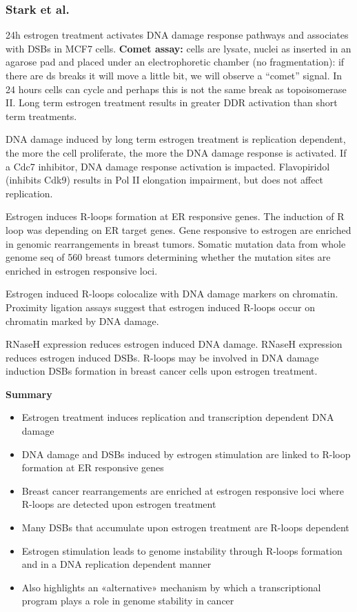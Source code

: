 \hypertarget{stark-et-al.}{%
\subsubsection{Stark et al.}\label{stark-et-al.}}

24h estrogen treatment activates DNA damage response pathways and associates with DSBs in MCF7 cells. \textbf{Comet assay:} cells are lysate, nuclei as inserted in an agarose pad and placed under an electrophoretic chamber (no fragmentation): if there are ds breaks it will move a little bit, we will observe a ``comet'' signal. In 24 hours cells can cycle and perhaps this is not the same break as topoisomerase II. Long term estrogen treatment results in greater DDR activation than short term treatments.

DNA damage induced by long term estrogen treatment is replication dependent, the more the cell proliferate, the more the DNA damage response is activated. If a Cdc7 inhibitor, DNA damage response activation is impacted. Flavopiridol (inhibits Cdk9) results in Pol II elongation impairment, but does not affect replication.

Estrogen induces R-loops formation at ER responsive genes. The induction of R loop was depending on ER target genes. Gene responsive to estrogen are enriched in genomic rearrangements in breast tumors. Somatic mutation data from whole genome seq of 560 breast tumors determining whether the mutation sites are enriched in estrogen responsive loci.

Estrogen induced R-loops colocalize with DNA damage markers on chromatin. Proximity ligation assays suggest that estrogen induced R-loops occur on chromatin marked by DNA damage.

RNaseH expression reduces estrogen induced DNA damage. RNaseH expression reduces estrogen induced DSBs. R-loops may be involved in DNA damage induction DSBs formation in breast cancer cells upon estrogen treatment.

\textbf{Summary}

\begin{itemize}
\tightlist
\item
  Estrogen treatment induces replication and transcription dependent DNA damage
\item
  DNA damage and DSBs induced by estrogen stimulation are linked to R-loop formation at ER responsive genes
\item
  Breast cancer rearrangements are enriched at estrogen responsive loci where R-loops are detected upon estrogen treatment
\item
  Many DSBs that accumulate upon estrogen treatment are R-loops dependent
\item
  Estrogen stimulation leads to genome instability through R-loops formation and in a DNA
  replication dependent manner
\item
  Also highlights an «alternative» mechanism by which a transcriptional program plays a role in genome stability in cancer
\end{itemize}
